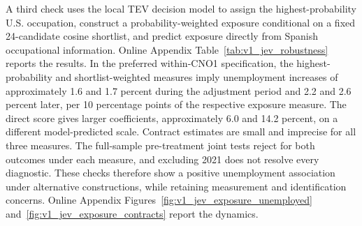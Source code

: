 A third check uses the local TEV decision model to assign the highest-probability U.S. occupation, construct a probability-weighted exposure conditional on a fixed 24-candidate cosine shortlist, and predict exposure directly from Spanish occupational information. Online Appendix Table~\ref{tab:v1_jev_robustness} reports the results. In the preferred within-CNO1 specification, the highest-probability and shortlist-weighted measures imply unemployment increases of approximately 1.6 and 1.7 percent during the adjustment period and 2.2 and 2.6 percent later, per 10 percentage points of the respective exposure measure. The direct score gives larger coefficients, approximately 6.0 and 14.2 percent, on a different model-predicted scale. Contract estimates are small and imprecise for all three measures. The full-sample pre-treatment joint tests reject for both outcomes under each measure, and excluding 2021 does not resolve every diagnostic. These checks therefore show a positive unemployment association under alternative constructions, while retaining measurement and identification concerns. Online Appendix Figures~\ref{fig:v1_jev_exposure_unemployed} and~\ref{fig:v1_jev_exposure_contracts} report the dynamics.
